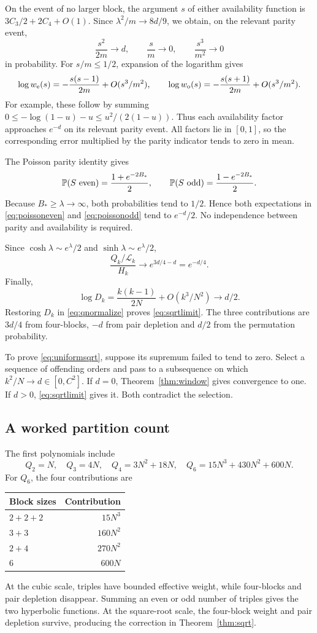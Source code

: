 On the event of no larger block, the argument $s$ of either availability function is $3C_3/2+2C_4+O(1)$. Since $\lambda^2/m\to8d/9$, we obtain, on the relevant parity event,
\[
\frac{s^2}{2m}\to d,\qquad \frac sm\to0,\qquad \frac{s^3}{m^2}\to0
\]
in probability. For $s/m\le1/2$, expansion of the logarithm gives
\[
\log w_{\rm e}(s)=-\frac{s(s-1)}{2m}+O(s^3/m^2),\qquad
\log w_{\rm o}(s)=-\frac{s(s+1)}{2m}+O(s^3/m^2).
\]
For example, these follow by summing
$0\le-\log(1-u)-u\le u^2/(2(1-u))$.
Thus each availability factor approaches $e^{-d}$ on its relevant parity event. All factors lie in $[0,1]$, so the corresponding error multiplied by the parity indicator tends to zero in mean.

The Poisson parity identity gives
\[
\mathbb P(S\text{ even})=\frac{1+e^{-2B_*}}2,\qquad
\mathbb P(S\text{ odd})=\frac{1-e^{-2B_*}}2.
\]
Because $B_*\ge\lambda\to\infty$, both probabilities tend to $1/2$. Hence both expectations in \eqref{eq:poissoneven} and \eqref{eq:poissonodd} tend to $e^{-d}/2$. No independence between parity and availability is required.

Since $\cosh\lambda\sim e^\lambda/2$ and $\sinh\lambda\sim e^\lambda/2$,
\[
\frac{Q_k/\mathcal L_k}{H_k}\longrightarrow e^{3d/4-d}=e^{-d/4}.
\]
Finally,
\[
\log D_k=\frac{k(k-1)}{2N}+O(k^3/N^2)\longrightarrow d/2.
\]
Restoring $D_k$ in \eqref{eq:qnormalize} proves \eqref{eq:sqrtlimit}. The three contributions are $3d/4$ from four-blocks, $-d$ from pair depletion and $d/2$ from the permutation probability.

To prove \eqref{eq:uniformsqrt}, suppose its supremum failed to tend to zero. Select a sequence of offending orders and pass to a subsequence on which $k^2/N\to d\in[0,C^2]$. If $d=0$, Theorem~\ref{thm:window} gives convergence to one. If $d>0$, \eqref{eq:sqrtlimit} gives it. Both contradict the selection.

\subsection{A worked partition count}

The first polynomials include
\[
Q_2=N,\quad Q_3=4N,\quad Q_4=3N^2+18N,\quad
Q_6=15N^3+430N^2+600N.
\]
For $Q_6$, the four contributions are
\begin{center}
\begin{tabular}{lr}
\toprule
Block sizes & Contribution\\
\midrule
$2+2+2$ & $15N^3$\\
$3+3$ & $160N^2$\\
$2+4$ & $270N^2$\\
$6$ & $600N$\\
\bottomrule
\end{tabular}
\end{center}
At the cubic scale, triples have bounded effective weight, while four-blocks and pair depletion disappear. Summing an even or odd number of triples gives the two hyperbolic functions. At the square-root scale, the four-block weight and pair depletion survive, producing the correction in Theorem~\ref{thm:sqrt}.

